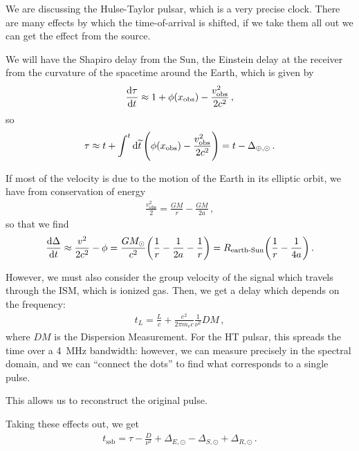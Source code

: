 \documentclass[main.tex]{subfiles}
\begin{document}

We are discussing the Hulse-Taylor pulsar, which is a very precise clock.
There are many effects by which the time-of-arrival is shifted, if we take them all out we can get the effect from the source. 

We will have the Shapiro delay from the Sun, the Einstein delay at the receiver from the curvature of the spacetime around the Earth, which is given by 
%
\begin{align}
\dv{\tau }{t} \approx 1 + \phi \qty(x _{\text{obs}}) - \frac{v^2 _{\text{obs}}}{2c^2}
\,,
\end{align}
%
so 
%
\begin{align}
\tau \approx t + \int^{t} \dd{\widetilde{t}} \qty(\phi \qty(x _{\text{obs}}) - \frac{v^2 _{\text{obs}}}{2c^2})
= t - \Delta_{\oplus, \odot}
\,.
\end{align}

If most of the velocity is due to the motion of the Earth in its elliptic orbit, we have from conservation of energy
%
\begin{align}
\frac{v^2 _{\text{obs}}}{2} = \frac{GM}{r} - \frac{GM}{2a}
\,,
\end{align}
%
so that we find 
%
\begin{align}
\dv{ \Delta}{t} \approx \frac{v^2}{2c^2} - \phi = \frac{GM_{\odot}}{c^2} \qty( \frac{1}{r} - \frac{1}{2a} - \frac{1}{r})
= R_{\text{earth-Sun}} \qty( \frac{1}{r} - \frac{1}{4a})
\,.
\end{align}

However, we must also consider the group velocity of the signal which travels through the ISM, which is ionized gas. Then, we get a delay which depends on the frequency: 
%
\begin{align}
t_L = \frac{L}{c} + \frac{e^2}{2 \pi m_e c} \frac{1}{\nu^2} DM
\,,
\end{align}
%
where \(DM\) is the Dispersion Measurement. 
For the HT pulsar, this spreads the time over a \SI{4}{MHz} bandwidth: 
however, we can measure precisely in the spectral domain, and we can ``connect the dots'' to find what corresponds to a single pulse. 

This allows us to reconstruct the original pulse.

Taking these effects out, we get 
%
\begin{align}
t _{\text{ssb}} = \tau - \frac{D}{\nu^2} + \Delta_{E, {\odot}} - \Delta_{S, {\odot}} + \Delta_{R, {\odot}}
\,.
\end{align}
\end{document}
